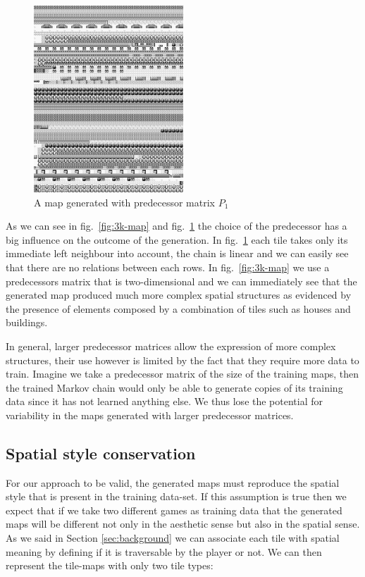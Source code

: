 \documentclass[A4paper,]{article}
\begin{document}
\begin{figure}
\centering
\includegraphics[width=0.50000\textwidth]{../data/pokemon-red/generated/250n-1k/image/7.png}
\caption{A map generated with predecessor matrix
\(P_1\)}\label{fig:1k-map}
\end{figure}

As we can see in fig.~\ref{fig:3k-map} and fig.~\ref{fig:1k-map} the
choice of the predecessor has a big influence on the outcome of the
generation. In fig.~\ref{fig:1k-map} each tile takes only its immediate
left neighbour into account, the chain is linear and we can easily see
that there are no relations between each rows. In fig.~\ref{fig:3k-map}
we use a predecessors matrix that is two-dimensional and we can
immediately see that the generated map produced much more complex
spatial structures as evidenced by the presence of elements composed by
a combination of tiles such as houses and buildings.

In general, larger predecessor matrices allow the expression of more
complex structures, their use however is limited by the fact that they
require more data to train. Imagine we take a predecessor matrix of the
size of the training maps, then the trained Markov chain would only be
able to generate copies of its training data since it has not learned
anything else. We thus lose the potential for variability in the maps
generated with larger predecessor matrices.

\subsection{Spatial style conservation}\label{sec:spatial-style}

For our approach to be valid, the generated maps must reproduce the
spatial style that is present in the training data-set. If this
assumption is true then we expect that if we take two different games as
training data that the generated maps will be different not only in the
aesthetic sense but also in the spatial sense. As we said in Section
\ref{sec:background} we can associate each tile with spatial meaning by
defining if it is traversable by the player or not. We can then
represent the tile-maps with only two tile types:
\end{document}
